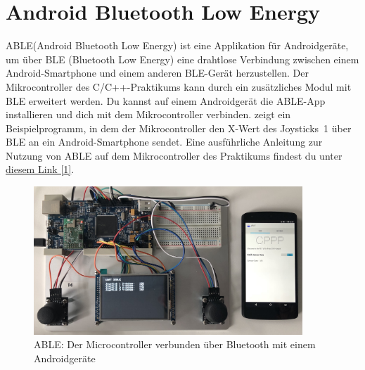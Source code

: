 \section{\ExercisePrefixEmbeddedC Android Bluetooth Low Energy \optional}
\newcommand{\toolAble}{\textsc{ABLE}\xspace}
\toolAble (Android Bluetooth Low Energy) ist eine Applikation für Androidgeräte, um über BLE (Bluetooth Low Energy) eine drahtlose Verbindung zwischen einem Android-Smartphone und einem anderen BLE-Gerät herzustellen.
Der Mikrocontroller des C/C++-Praktikums kann durch ein zusätzliches Modul mit BLE erweitert werden.
Du kannst auf einem Androidgerät die \toolAble-App installieren und dich mit dem Mikrocontroller verbinden.
 zeigt ein Beispielprogramm, in dem der Mikrocontroller den X-Wert des Joysticks~1 über BLE an ein Android-Smartphone sendet.
Eine ausführliche Anleitung zur Nutzung von \toolAble auf dem Mikrocontroller des Praktikums findest du unter \href{https://github.com/Echtzeitsysteme/able/wiki/Cpp-Lab-Tutorial}{diesem Link [1]}. 
\begin{figure}[!htb]
	\centering
	\includegraphics[width=0.9\textwidth]{./05_c/figures/ABLE_preview.jpg}
	\caption{\toolAble: Der Microcontroller verbunden über Bluetooth mit einem Androidgeräte}
	\label{fig:ablePreview}
\end{figure} 
